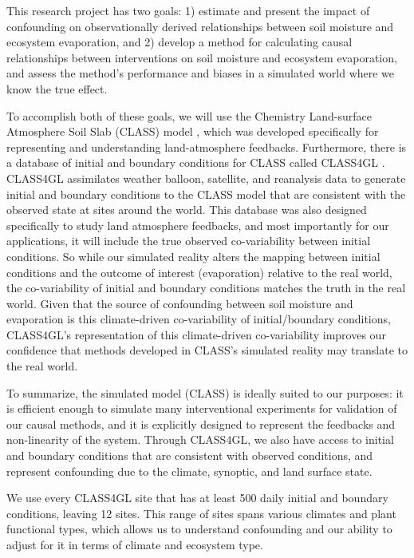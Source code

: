 \documentclass[12pt]{article}
\begin{document}
This research project has two goals: 1) estimate and present the
impact of confounding on observationally derived relationships between
soil moisture and ecosystem evaporation, and 2) develop a method for
calculating causal relationships between interventions on soil
moisture and ecosystem evaporation, and assess the method's
performance and biases in a simulated world where we know the true
effect.

To accomplish both of these goals, we will use the Chemistry
Land-surface Atmosphere Soil Slab (CLASS) model
\cite[\url{https://classmodel.github.io/}, ]{de2015atmospheric,},
which was developed specifically for representing and understanding
land-atmosphere feedbacks. Furthermore, there is a database of initial
and boundary conditions for CLASS called CLASS4GL
\cite[\url{https://class4gl.eu/}]{wouters-class4gl-2019}. CLASS4GL
assimilates weather balloon, satellite, and reanalysis data to
generate initial and boundary conditions to the CLASS model that are
consistent with the observed state at sites around the world. This
database was also designed specifically to study land atmosphere
feedbacks, and most importantly for our applications, it will include
the true observed co-variability between initial conditions. So while
our simulated reality alters the mapping between initial conditions
and the outcome of interest (evaporation) relative to the real world,
the co-variability of initial and boundary conditions matches the
truth in the real world. Given that the source of confounding between
soil moisture and evaporation is this climate-driven co-variability of
initial/boundary conditions, CLASS4GL's representation of this
climate-driven co-variability improves our confidence that methods
developed in CLASS's simulated reality may translate to the real
world.

To summarize, the simulated model (CLASS) is ideally suited to our
purposes: it is efficient enough to simulate many interventional
experiments for validation of our causal methods, and it is explicitly
designed to represent the feedbacks and non-linearity of the
system. Through CLASS4GL, we also have access to initial and boundary
conditions that are consistent with observed conditions, and represent
confounding due to the climate, synoptic, and land surface state.

We use every CLASS4GL site that has at least 500 daily initial and
boundary conditions, leaving 12 sites. This range of sites spans
various climates and plant functional types, which allows us to
understand confounding and our ability to adjust for it in terms of
climate and ecosystem type.
\end{document}

